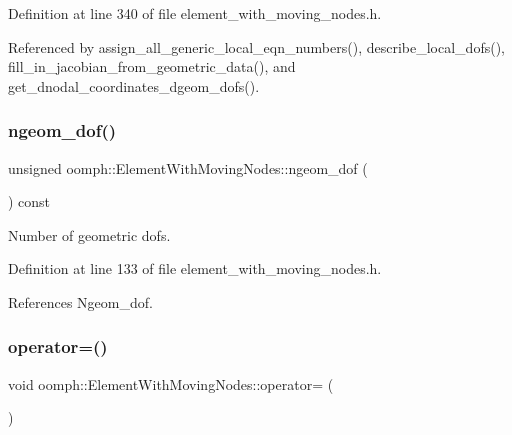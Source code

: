 Definition at line 340 of file element\+\_\+with\+\_\+moving\+\_\+nodes.\+h.



Referenced by assign\+\_\+all\+\_\+generic\+\_\+local\+\_\+eqn\+\_\+numbers(), describe\+\_\+local\+\_\+dofs(), fill\+\_\+in\+\_\+jacobian\+\_\+from\+\_\+geometric\+\_\+data(), and get\+\_\+dnodal\+\_\+coordinates\+\_\+dgeom\+\_\+dofs().

\mbox{\label{classoomph_1_1ElementWithMovingNodes_a14f1abd33151ddaa8705b23d93d57037}} 
\subsubsection{\texorpdfstring{ngeom\+\_\+dof()}{ngeom\_dof()}}
{\footnotesize\ttfamily unsigned oomph\+::\+Element\+With\+Moving\+Nodes\+::ngeom\+\_\+dof (\begin{DoxyParamCaption}{ }\end{DoxyParamCaption}) const\hspace{0.3cm}{\ttfamily [inline]}}



Number of geometric dofs. 



Definition at line 133 of file element\+\_\+with\+\_\+moving\+\_\+nodes.\+h.



References Ngeom\+\_\+dof.

\mbox{\label{classoomph_1_1ElementWithMovingNodes_a0037d698fed48c069c26e869b3fa8d49}} 
\subsubsection{\texorpdfstring{operator=()}{operator=()}}
{\footnotesize\ttfamily void oomph\+::\+Element\+With\+Moving\+Nodes\+::operator= (\begin{DoxyParamCaption}\item[{const \hyperlink{classoomph_1_1ElementWithMovingNodes}{Element\+With\+Moving\+Nodes} \&}]{ }\end{DoxyParamCaption})\hspace{0.3cm}{\ttfamily [inline]}}



